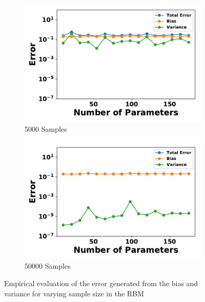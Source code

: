 \documentclass[letterpaper]{article} %
\begin{document}
\begin{figure}[p]
\begin{subfigure}[b]{0.245\textwidth}
              \includegraphics[width=\textwidth]{./RBM_Error_vs_HiddenNodes_Samples5000-eps-converted-to.pdf}
              \caption{5000 Samples}
          \end{subfigure}
          \begin{subfigure}[b]{0.245\textwidth}
              \centering
              \includegraphics[width=\textwidth]{./RBM_Error_vs_HiddenNodes_Samples50000-eps-converted-to.pdf}
              \caption{50000 Samples}
          \end{subfigure}
          \caption{Empirical evaluation of the error generated from the bias and variance for varying sample size in the RBM} \label{fig:RBM_hidden_nodes}
        \end{figure}
\end{document}
